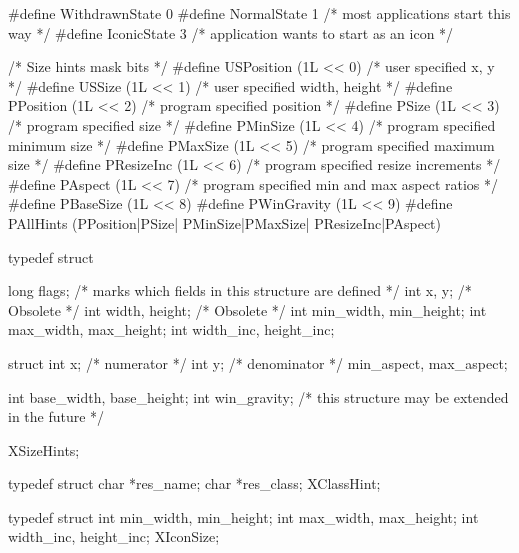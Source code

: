 \documentclass{report}
\begin{document}
\begin{itemize}
\begin{cppcode}
                #define WithdrawnState 0
                #define NormalState 1           /* most applications start this way */
                #define IconicState 3           /* application wants to start as an icon */
            \end{cppcode}
            \begin{cppcode}
                /* Size hints mask bits */
                #define USPosition      (1L << 0)       /* user specified x, y */
                #define USSize          (1L << 1)       /* user specified width, height */
                #define PPosition       (1L << 2)       /* program specified position */
                #define PSize           (1L << 3)       /* program specified size */
                #define PMinSize        (1L << 4)       /* program specified minimum size */
                #define PMaxSize        (1L << 5)       /* program specified maximum size */
                #define PResizeInc      (1L << 6)       /* program specified resize increments */
                #define PAspect         (1L << 7)       /* program specified min and max aspect ratios */
                #define PBaseSize       (1L << 8)
                #define PWinGravity     (1L << 9)
                #define PAllHints   (PPosition|PSize| PMinSize|PMaxSize| PResizeInc|PAspect)
            \end{cppcode}
            \begin{cppcode}
                typedef struct {
                    long flags;                     /* marks which fields in this structure are defined */
                    int x, y;                       /* Obsolete */
                    int width, height;              /* Obsolete */
                    int min_width, min_height;
                    int max_width, max_height;
                    int width_inc, height_inc;

                    struct {
                        int x;                      /* numerator */
                        int y;                      /* denominator */
                    } min_aspect, max_aspect;

                    int base_width, base_height;
                    int win_gravity;
                    /* this structure may be extended in the future */
                } XSizeHints;
            \end{cppcode}
            \begin{cppcode}
                typedef struct {
                    char *res_name;
                    char *res_class;
                } XClassHint;
            \end{cppcode}
            \begin{cppcode}
            typedef struct {
                int min_width, min_height;
                int max_width, max_height;
                int width_inc, height_inc;
            } XIconSize;
            \end{cppcode}



\end{itemize}
\end{document}
